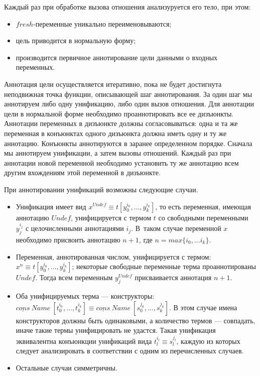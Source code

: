\documentclass[conference,american,russian]{IEEEtran}
\begin{document}
Каждый раз при обработке вызова отношения анализуруется его тело, при этом: 
\begin{itemize}
    \item $fresh$-переменные уникально переименовываются;
    \item цель приводится в нормальную форму;
    \item производится первичное аннотирование цели данными о входных переменных.
\end{itemize}

Аннотация цели осуществляется итеративно, пока не будет достигнута неподвижная точка функции, описывающей шаг аннотирования. 
За один шаг мы аннотируем либо одну унификацию, либо один вызов отношения. 
Для аннотации цели в нормальной форме необходимо проаннотировать все ее дизъюнкты. 
Аннотации переменных в дизъюнкте должны согласовываться: одна и та же переменная в конъюнктах одного дизъюнкта должна иметь одну и ту же аннотацию.
Конъюнкты аннотируются в заранее определенном порядке. 
Сначала мы аннотируем унификации, а затем вызовы отношений. 
Каждый раз при аннотации новой переменной необходимо установить ту же аннотацию всем другим вхождениям этой переменной в дизъюнкте. 

При аннотировании унификаций возможны следующие случаи. 
\begin{itemize}
    \item Унификация имеет вид $x^{Undef} \equiv t[y_0^{i_0}, \dots, y_k^{i_k}]$, то есть переменная, имеющая аннотацию $Undef$, унифицируется с термом $t$ со свободными переменными $y_j^{i_j}$ с целочисленными аннотациями $i_j$. В~таком случае переменной $x$ необходимо присвоить аннотацию $n + 1$, где $n = max \{ i_0, \dots i_k\}$.
    \item Переменная, аннотированная числом, унифицируется с термом: $x^{n} \equiv t[y_0^{i_0}, \dots, y_k^{i_k}]$; некоторые свободные переменные терма проаннотированы $Undef$.
    Тогда всем переменным $y_j^{Undef}$ присваивается аннотация $n+1$.
    \item Оба унифицируемых терма --- конструкторы: $\underline{cons} \ Name \ [t_0^{i_0}, \dots, t_k^{i_k}] \equiv \underline{cons} \ Name \ [s_0^{j_0}, \dots, s_k^{j_k}]$.
    В этом случае имена конструкторов должны быть одинаковыми, а количество термов --- совпадать, иначе такие термы унифицировать не удастся.
    Такая унификация эквивалентна конъюнкции унификаций вида $t_l^{i_l} \equiv s_l^{j_l}$, каждую из которых следует анализировать в соответствии с одним из перечисленных случаев.  
    \item Остальные случаи симметричны.
\end{itemize}
\end{document}
